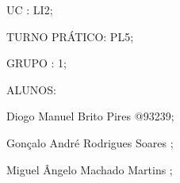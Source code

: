 
\begin{DoxyItemize}
\item UC \+: L\+I2;
\item T\+U\+R\+NO P\+RÁ\+T\+I\+CO\+: P\+L5;
\item G\+R\+U\+PO \+: 1;
\item A\+L\+U\+N\+OS\+:
\begin{DoxyItemize}
\item Diogo Manuel Brito Pires @93239;
\item Gonçalo André Rodrigues Soares ;
\begin{DoxyItemize}
\item Miguel Ângelo Machado Martins ; 
\end{DoxyItemize}
\end{DoxyItemize}
\end{DoxyItemize}